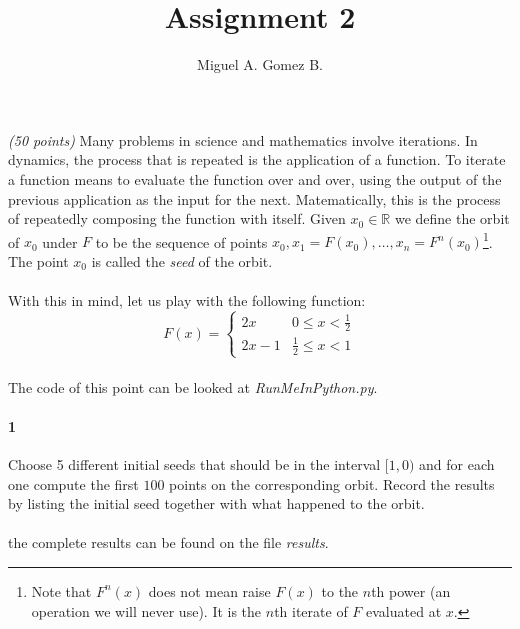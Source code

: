 \documentclass{article}
\title{Assignment 2}
\author{Miguel A. Gomez B.}
\begin{document}
	\maketitle
\paragraph{} \textit{(50 points)} Many problems in science and mathematics involve iterations. In dynamics, the process that is repeated is the application of a function. To iterate a function means to evaluate the function over and over, using the output of the previous application as the input for the next. Matematically, this is the process of repeatedly composing the function with itself. Given $x_0 \in \mathbb{R}$ we define the orbit of $x_0$ under $F$ to be the sequence of points $x_0, x_1 = F(x_0),\dots, x_n = F^n(x_0)$\footnote{Note that $F^n(x)$ does not mean raise $F(x)$ to the $n$th power (an operation we will never use). It is the $n$th iterate of $F$ evaluated at $x$.}. The point $x_0$ is called the \textit{seed} of the orbit.
\paragraph{}With this in mind, let us play with the following function:
\[ 
	F(x) = 
	\begin{cases} 
		2x & 0 \leq x < \frac{1}{2} \\
		2x - 1 & \frac{1}{2} \leq x < 1
	\end{cases}
\]
\paragraph{} The code of this point can be looked at \textit{RunMeInPython.py}.
\paragraph{1} Choose 5 different initial seeds that should be in the interval $[1,0)$ and for each one compute the first $100$ points on the corresponding orbit. Record the results by listing the initial seed together with what happened to the orbit.
\begin{center}
\end{center}
\paragraph{} the complete results can be found on the file \textit{results}.
\end{document}
